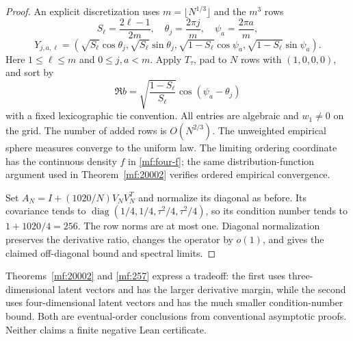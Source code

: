 \begin{proof}
An explicit discretization uses \(m=\lfloor N^{1/3}\rfloor\) and the
\(m^3\) rows
\[
 S_\ell=\frac{2\ell-1}{2m},\quad
 \theta_j=\frac{2\pi j}{m},\quad \psi_a=\frac{2\pi a}{m},
\]
\[
 Y_{j,a,\ell}=
 (\sqrt{S_\ell}\cos\theta_j,\sqrt{S_\ell}\sin\theta_j,
  \sqrt{1-S_\ell}\cos\psi_a,\sqrt{1-S_\ell}\sin\psi_a).
\]
Here \(1\le\ell\le m\) and \(0\le j,a<m\).
Apply \(T_\tau\), pad to \(N\) rows with \((1,0,0,0)\), and sort by
\[
 \Re b=\sqrt{\frac{1-S_\ell}{S_\ell}}\cos(\psi_a-\theta_j)
\]
with a fixed lexicographic tie convention. All entries are algebraic
and \(w_1\ne0\) on the grid. The number of added rows is \(O(N^{2/3})\).
The unweighted empirical sphere measures converge to the uniform law.
The limiting ordering coordinate has the continuous density \(f\) in
\eqref{mf:four-f}; the same distribution-function argument used in
Theorem~\ref{mf:20002} verifies ordered empirical convergence.

Set \(A_N=I+(1020/N)V_NV_N^T\) and normalize its diagonal as before.
Its covariance tends to
\(\operatorname{diag}(1/4,1/4,\tau^2/4,\tau^2/4)\), so its condition
number tends to \(1+1020/4=256\).
The row norms are at most one. Diagonal normalization preserves the
derivative ratio, changes the operator by \(o(1)\), and gives the claimed
off-diagonal bound and spectral limits.
\end{proof}

Theorems~\ref{mf:20002} and \ref{mf:257} express a tradeoff: the first
uses three-dimensional latent vectors and has the larger derivative
margin, while the second uses four-dimensional latent vectors and has
the much smaller condition-number bound.
Both are eventual-order conclusions from conventional asymptotic proofs.
Neither claims a finite negative Lean certificate.

